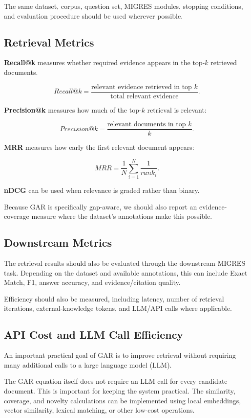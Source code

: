 \documentclass[11pt,a4paper]{article}
\begin{document}
The same dataset, corpus, question set, MIGRES modules, stopping conditions, and evaluation procedure should be used wherever possible.

\subsection{Retrieval Metrics}

\textbf{Recall@k} measures whether required evidence appears in the top-$k$ retrieved documents.

\[
Recall@k=
\frac{\text{relevant evidence retrieved in top }k}
{\text{total relevant evidence}}.
\]

\textbf{Precision@k} measures how much of the top-$k$ retrieval is relevant:

\[
Precision@k=
\frac{\text{relevant documents in top }k}{k}.
\]

\textbf{MRR} measures how early the first relevant document appears:

\[
MRR=
\frac{1}{N}
\sum_{i=1}^{N}
\frac{1}{rank_i}.
\]

\textbf{nDCG} can be used when relevance is graded rather than binary.

Because GAR is specifically gap-aware, we should also report an evidence-coverage measure where the dataset's annotations make this possible.

\subsection{Downstream Metrics}

The retrieval results should also be evaluated through the downstream MIGRES task. Depending on the dataset and available annotations, this can include Exact Match, F1, answer accuracy, and evidence/citation quality.

Efficiency should also be measured, including latency, number of retrieval iterations, external-knowledge tokens, and LLM/API calls where applicable.


\subsection{API Cost and LLM Call Efficiency}

An important practical goal of GAR is to improve retrieval without requiring many additional calls to a large language model (LLM).

The GAR equation itself does not require an LLM call for every candidate document. This is important for keeping the system practical. The similarity, coverage, and novelty calculations can be implemented using local embeddings, vector similarity, lexical matching, or other low-cost operations.
\end{document}
